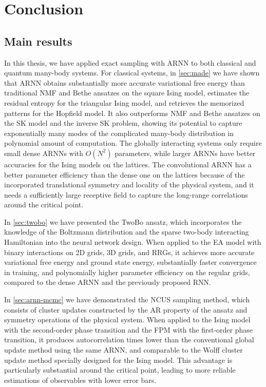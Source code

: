 \chapter{Conclusion}
\label{ch:conclusion}

\section{Main results}

In this thesis, we have applied exact sampling with ARNN to both classical and quantum many-body systems. For classical systems, in \cref{sec:made} we have shown that ARNN obtains substantially more accurate variational free energy than traditional NMF and Bethe ansatzes on the square Ising model, estimates the residual entropy for the triangular Ising model, and retrieves the memorized patterns for the Hopfield model. It also outperforms NMF and Bethe ansatzes on the SK model and the inverse SK problem, showing its potential to capture exponentially many modes of the complicated many-body distribution in polynomial amount of computation. The globally interacting systems only require small dense ARNNs with $O(N^2)$ parameters, while larger ARNNs have better accuracies for the Ising models on the lattices. The convolutional ARNN has a better parameter efficiency than the dense one on the lattices because of the incorporated translational symmetry and locality of the physical system, and it needs a sufficiently large receptive field to capture the long-range correlations around the critical point.

In \cref{sec:twobo} we have presented the TwoBo ansatz, which incorporates the knowledge of the Boltzmann distribution and the sparse two-body interacting Hamiltonian into the neural network design. When applied to the EA model with binary interactions on 2D grids, 3D grids, and RRGs, it achieves more accurate variational free energy and ground state energy, substantially faster convergence in training, and polynomially higher parameter efficiency on the regular grids, compared to the dense ARNN and the previously proposed RNN.

In \cref{sec:arnn-mcmc} we have demonstrated the NCUS sampling method, which consists of cluster updates constructed by the AR property of the ansatz and symmetry operations of the physical system. When applied to the Ising model with the second-order phase transition and the FPM with the first-order phase transition, it produces autocorrelation times lower than the conventional global update method using the same ARNN, and comparable to the Wolff cluster update method specially designed for the Ising model. This advantage is particularly substantial around the critical point, leading to more reliable estimations of observables with lower error bars.

